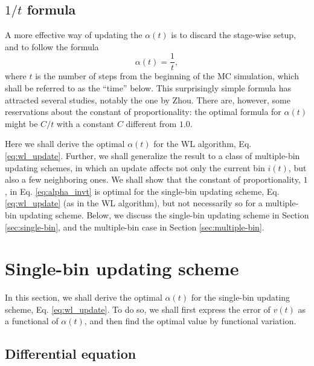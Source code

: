 \documentclass[reprint]{revtex4-1}
\begin{document}
\subsection{$1/t$ formula}



A more effective way
of updating the $\alpha(t)$
is to discard the stage-wise setup,
and to follow the formula
%
\begin{equation}
  \alpha(t) = \frac{1}{t},
  \label{eq:alpha_invt}
\end{equation}
%
where $t$ is the number of steps
from the beginning of the MC simulation,
which shall be referred to as the ``time'' below.
%
This surprisingly simple formula has attracted
several studies, notably the one by Zhou.
%
There are, however, some reservations about
the constant of proportionality:
the optimal formula for $\alpha(t)$
might be $C/t$ with a constant $C$
different from $1.0$.



Here we shall derive the optimal $\alpha(t)$
for the WL algorithm, Eq. \eqref{eq:wl_update}.
%
Further, we shall generalize the result
to a class of multiple-bin updating schemes,
in which an update affects
not only the current bin $i(t)$,
but also a few neighboring ones.
%
We shall show that
the constant of proportionality, $1$,
in Eq. \eqref{eq:alpha_invt}
is optimal for the single-bin updating scheme,
Eq. \eqref{eq:wl_update}
(as in the WL algorithm),
but not necessarily so
for a multiple-bin updating scheme.
%
Below, we discuss the single-bin updating scheme
in Section \ref{sec:single-bin},
and the multiple-bin case
in Section \ref{sec:multiple-bin}.



\section{\label{sec:single-bin}
Single-bin updating scheme}



In this section,
we shall derive the optimal $\alpha(t)$
for the single-bin updating scheme,
Eq. \eqref{eq:wl_update}.
%
To do so,
we shall first express the error of $v(t)$
as a functional of $\alpha(t)$,
and then find the optimal value
by functional variation.



\subsection{Differential equation}
\end{document}

